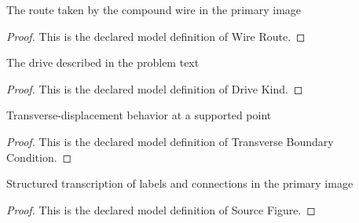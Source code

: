 \begin{definition}
  \label{def:physics:phyx-mini-0299:phyxminiproblems-problemphyxmini0299-wireroute}
  The route taken by the compound wire in the primary image
\end{definition}
\begin{proof}
  This is the declared model definition of Wire Route.
\end{proof}
\begin{definition}
  \label{def:physics:phyx-mini-0299:phyxminiproblems-problemphyxmini0299-drivekind}
  The drive described in the problem text
\end{definition}
\begin{proof}
  This is the declared model definition of Drive Kind.
\end{proof}
\begin{definition}
  \label{def:physics:phyx-mini-0299:phyxminiproblems-problemphyxmini0299-transverseboundarycondition}
  Transverse-displacement behavior at a supported point
\end{definition}
\begin{proof}
  This is the declared model definition of Transverse Boundary Condition.
\end{proof}
\begin{definition}
  \label{def:physics:phyx-mini-0299:phyxminiproblems-problemphyxmini0299-sourcefigure}
  Structured transcription of labels and connections in the primary image
\end{definition}
\begin{proof}
  This is the declared model definition of Source Figure.
\end{proof}
